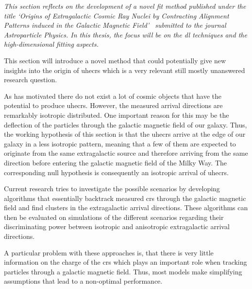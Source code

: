 
\label{sec:magnet}

\emph{This section reflects on the development of a novel fit method published under the title `Origins of Extragalactic Cosmic Ray Nuclei by Contracting Alignment Patterns induced in the Galactic Magnetic Field'~\cite{Erdmann2018a} submitted to the journal Astroparticle Physics. In this thesis, the focus will be on the \gls{dl} techniques and the high-dimensional fitting aspects.}

This section will introduce a novel method that could potentially give new insights into the origin of \glspl{uhecr} which is a very relevant still mostly unanswered research question.

As  has motivated there do not exist a lot of cosmic objects that have the potential to produce \glspl{uhecr}. However, the measured arrival directions are remarkably isotropic distributed. One important reason for this may be the deflection of the particles through the galactic magnetic field of our galaxy. Thus, the working hypothesis of this section is that the \glspl{uhecr} arrive at the edge of our galaxy in a less isotropic pattern, meaning that a few of them are expected to originate from the same extragalactic source and therefore arriving from the same direction before entering the galactic magnetic field of the Milky Way. The corresponding null hypothesis is consequently an isotropic arrival of \glspl{uhecr}.

Current research tries to investigate the possible scenarios by developing algorithms that essentially backtrack measured \glspl{cr} through the galactic magnetic field and find clusters in the extragalactic arrival directions. These algorithms can then be evaluated on simulations of the different scenarios regarding their discriminating power between isotropic and anisotropic extragalactic arrival directions.

A particular problem with these approaches is, that there is very little information on the charge of the \glspl{cr} which plays an important role when tracking particles through a galactic magnetic field. Thus, most models make simplifying assumptions that lead to a non-optimal performance.

